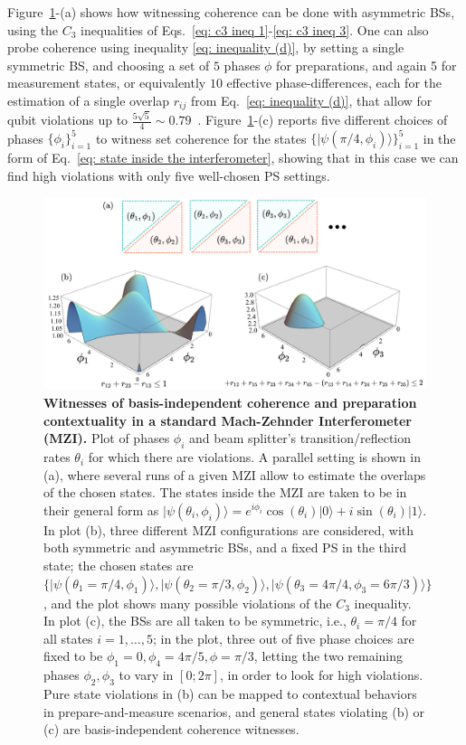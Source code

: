 \documentclass[letterpaper,onecolumn,12pt,accepted=2024-01-17]{article}
\begin{document}
Figure~\ref{fig:violation}-(a) shows how witnessing coherence can be done with asymmetric BSs, using the $C_3$ inequalities of Eqs.~\eqref{eq: c3 ineq 1}-\eqref{eq: c3 ineq 3}. One can also probe coherence using inequality \eqref{eq: inequality (d)}, by setting a single symmetric BS, and choosing a  set of $5$ phases $\phi$ { for preparations, and again 5 for measurement states}, or equivalently $10$ effective phase-differences, { each for the estimation of a single overlap $r_{ij}$ from Eq.~\eqref{eq: inequality (d)},} that allow for qubit violations up to $\frac{5\sqrt{5}}{4}\sim 0.79$~\cite{wagner2022inequalities}. Figure~\ref{fig:violation}-(c) reports five different choices of phases $\{\phi_i\}_{i=1}^5$ to witness set coherence for the states $\{\vert \psi(\pi/4,\phi_i)\rangle \}_{i=1}^5$ in the form of Eq.~\eqref{eq: state inside the interferometer}, showing that in this case we can find high violations with only five well-chosen PS settings.
\begin{figure}[htb]
    \includegraphics[width=1\textwidth]{Acc_Figures/ViolationsFirstFigure.png}
    \caption{\textbf{Witnesses of basis-independent coherence and preparation contextuality in a standard Mach-Zehnder Interferometer (MZI).} Plot of phases $\phi_i$ and beam splitter's transition/reflection rates $\theta_i$ for which there are violations. A parallel setting is shown in (a),  where several runs of a given MZI allow to estimate the overlaps of the chosen states. The states inside the MZI are taken to be in their general form as $\vert \psi(\theta_i,\phi_i) \rangle = e^{i\phi_i}\cos(\theta_i)\vert 0 \rangle + i \sin(\theta_i)\vert 1 \rangle$. In plot (b), three different MZI configurations are considered, with both symmetric and asymmetric BSs, and a fixed PS in the third state; the chosen states are $\{\vert \psi(\theta_1 = \pi/4,\phi_1)\rangle , \vert \psi(\theta_2 = \pi/3,\phi_2)\rangle , \vert \psi(\theta_3 = 4\pi/4,\phi_3 = 6\pi/3) \rangle \}$, and the plot shows many possible violations of the $C_3$ inequality. In plot (c), the BSs are all taken to be symmetric, i.e., $\theta_i = \pi/4$ for all states $i=1,\dots,5$; in the plot, three out of five phase choices are fixed to be $\phi_1=0, \phi_4=4\pi/5, \phi = \pi/3$, letting the two remaining phases $\phi_2,\phi_3$ to vary in $[0; 2\pi]$, in order to look for high violations. Pure state violations in (b) can be mapped to contextual behaviors in prepare-and-measure scenarios, and general states violating (b) or (c) are basis-independent coherence witnesses.}  
    \label{fig:violation}
\end{figure}
\end{document}
